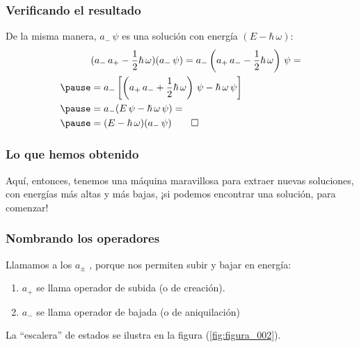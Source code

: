 \documentclass[12pt]{beamer}
\begin{document}
\begin{frame}
\frametitle{Verificando el resultado}
De la misma manera, $a_{-} \, \psi$ es una solución con energía $(E - \hbar \, \omega)$:
\pause
\begin{eqnarray*}
\begin{aligned}
&(a_{-} \, a_{+} - \dfrac{1}{2} \hbar \, \omega) (a_{-} \, \psi) = a_{-} \left( a_{+} \, a_{-} - \dfrac{1}{2} \hbar \, \omega \right) \, \psi = \\ \pause
&= a_{-} \left[ \left( a_{+} \, a_{-} + \dfrac{1}{2} \hbar \, \omega \right) \, \psi - \hbar \, \omega \, \psi \right] \\ \pause
&= a_{-} (E \, \psi - \hbar \, \omega \, \psi) = \\ \pause
&= (E - \hbar \, \omega) (a_{-} \, \psi) \qed
\end{aligned}
\end{eqnarray*}
\end{frame}
\begin{frame}
\frametitle{Lo que hemos obtenido}
Aquí, entonces, tenemos una máquina maravillosa para extraer nuevas soluciones, con energías más altas y más bajas, ¡si podemos encontrar una solución, para comenzar!
\end{frame}
\begin{frame}
\frametitle{Nombrando los operadores}
Llamamos a los $a_{\pm}$ , porque nos permiten subir y bajar en energía:
\pause
{}
\begin{enumerate}[<+->]
\item $a_{+}$ se llama operador de subida (o de creación).
\item $a_{-}$ se llama operador de bajada (o de aniquilación) 
\end{enumerate}
\pause
La \enquote{escalera} de estados se ilustra en la figura (\ref{fig:figura_002}).
\end{frame}
\end{document}
